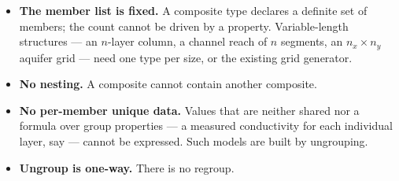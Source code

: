 \documentclass[11pt,a4paper]{article}
\begin{document}
\begin{itemize}[leftmargin=1.4em]
\item \textbf{The member list is fixed.} A composite type declares a definite
set of members; the count cannot be driven by a property. Variable-length
structures --- an $n$-layer column, a channel reach of $n$ segments, an
$n_x\times n_y$ aquifer grid --- need one type per size, or the existing grid
generator.
\item \textbf{No nesting.} A composite cannot contain another composite.
\item \textbf{No per-member unique data.} Values that are neither shared nor a
formula over group properties --- a measured conductivity for each individual
layer, say --- cannot be expressed. Such models are built by ungrouping.
\item \textbf{Ungroup is one-way.} There is no regroup.
\end{itemize}
\end{document}
